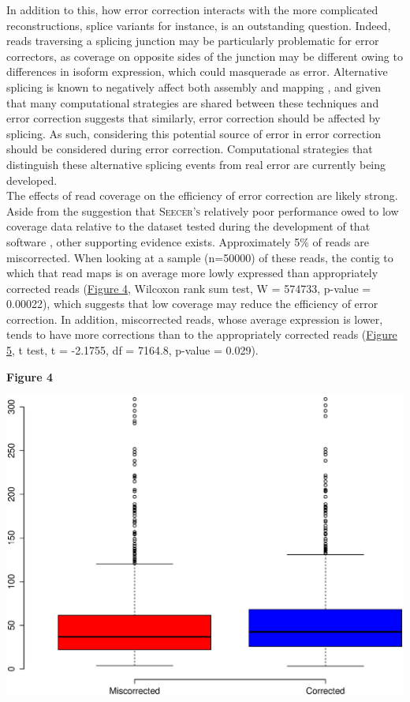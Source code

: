 \documentclass[11pt]{article}
\begin{document}
\noindent
In addition to this, how error correction interacts with the more complicated reconstructions, splice variants for instance, is an outstanding question. Indeed, reads traversing a splicing junction may be particularly problematic for error correctors, as coverage on opposite sides of the junction may be different owing to differences in isoform expression, which could masquerade as error.  Alternative splicing is known to negatively affect both assembly and mapping \citep{Vijay:2012gy,Sammeth:2009jx,Pyrkosz:2013tm}, and given that many computational strategies are shared between these techniques and error correction suggests that similarly, error correction should be affected by splicing.  As such, considering this potential source of error in error correction should be considered during error correction. Computational strategies that distinguish these alternative splicing events from real error are currently being developed.   \\
 
\noindent
The effects of read coverage on the efficiency of error correction are likely strong.  Aside from the suggestion that \textsc{Seecer's} relatively poor performance owed to low coverage data relative to the dataset tested during the development of that software \citep{Le:2013dy}, other supporting evidence exists.  Approximately 5\% of reads are miscorrected.  When looking at a sample (n=50000) of these reads, the contig to which that read maps is on average more lowly expressed than appropriately corrected reads (\hyperlink{Figure 4}{Figure 4}, Wilcoxon rank sum test, W = 574733, p-value = 0.00022), which suggests that low coverage may reduce the efficiency of error correction. In addition, miscorrected reads, whose average expression is lower, tends to have more corrections than to the appropriately corrected reads (\hyperlink{Figure 5}{Figure 5}, t test, t = -2.1755, df = 7164.8, p-value = 0.029).

\textbf{\hypertarget{Figure 4}{Figure 4}} \\
\centerline{\includegraphics[width=20.0\baselineskip]{Fig4final.eps}}
\end{document}
